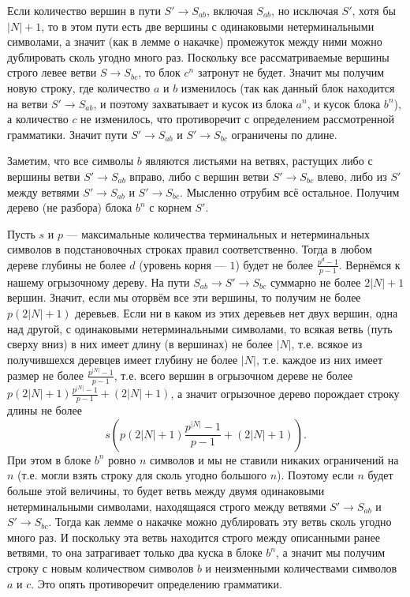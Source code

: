 \documentclass[12pt,a4paper]{article}
\begin{document}
\begin{problem}{8}
\begin{enumerate}
                Если количество вершин в пути $S' \to S_{ab}$, включая $S_{ab}$, но исключая $S'$, хотя бы $|N| + 1$, то в этом пути есть две вершины с одинаковыми нетерминальными символами, а значит (как в лемме о накачке) промежуток между ними можно дублировать сколь угодно много раз. Поскольку все рассматриваемые вершины строго левее ветви $S \to S_{bc}$, то блок $c^n$ затронут не будет. Значит мы получим новую строку, где количество $a$ и $b$ изменилось (так как данный блок находится на ветви $S' \to S_{ab}$, и поэтому захватывает и кусок из блока $a^n$, и кусок блока $b^n$), а количество $c$ не изменилось, что противоречит с определением рассмотренной грамматики. Значит пути $S' \to S_{ab}$ и $S' \to S_{bc}$ ограничены по длине.

                Заметим, что все символы $b$ являются листьями на ветвях, растущих либо с вершины ветви $S' \to S_{ab}$ вправо, либо с вершин ветви $S' \to S_{bc}$ влево, либо из $S'$ между ветвями $S' \to S_{ab}$ и $S' \to S_{bc}$. Мысленно отрубим всё остальное. Получим дерево (не разбора) блока $b^n$ с корнем $S'$.
                
                Пусть $s$ и $p$ --- максимальные количества терминальных и нетерминальных символов в подстановочных строках правил соответственно. Тогда в любом дереве глубины не более $d$ (уровень корня --- $1$) будет не более $\frac{p^d - 1}{p - 1}$. Вернёмся к нашему огрызочному дереву. На пути $S_{ab} \to S' \to S_{bc}$ суммарно не более $2|N| + 1$ вершин. Значит, если мы оторвём все эти вершины, то получим не более $p(2|N| + 1)$ деревьев. Если ни в каком из этих деревьев нет двух вершин, одна над другой, с одинаковыми нетерминальными символами, то всякая ветвь (путь сверху вниз) в них имеет длину (в вершинах) не более $|N|$, т.е. всякое из получившехся деревцев имеет глубину не более $|N|$, т.е. каждое из них имеет размер не более $\frac{p^{|N|} - 1}{p - 1}$, т.е. всего вершин в огрызочном дереве не более $p(2|N| + 1)\frac{p^{|N|} - 1}{p - 1} + (2|N| + 1)$, а значит огрызочное дерево порождает строку длины не более
                \[s\left(p(2|N| + 1)\frac{p^{|N|} - 1}{p - 1} + (2|N| + 1)\right).\]
                При этом в блоке $b^n$ ровно $n$ символов и мы не ставили никаких ограничений на $n$ (т.е. могли взять строку для сколь угодно большого $n$). Поэтому если $n$ будет больше этой величины, то будет ветвь между двумя одинаковыми нетерминальными символами, находящаяся строго между ветвями $S' \to S_{ab}$ и $S' \to S_{bc}$. Тогда как лемме о накачке можно дублировать эту ветвь сколь угодно много раз. И поскольку эта ветвь находится строго между описанными ранее ветвями, то она затрагивает только два куска в блоке $b^n$, а значит мы получим строку с новым количеством символов $b$ и неизменными количествами символов $a$ и $c$. Это опять противоречит определению грамматики.


\end{enumerate}
\end{problem}
\end{document}
